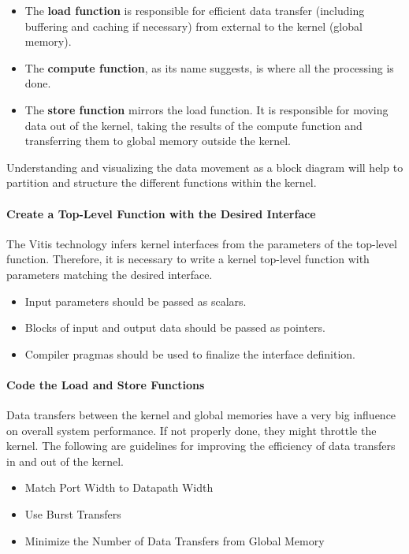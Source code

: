 \begin{itemize}
    \item The \textbf{load function} is responsible for efficient data transfer (including buffering and caching if necessary) from external to the kernel (\ie global memory).
    \item The \textbf{compute function}, as its name suggests, is where all the processing is done. 
    \item The \textbf{store function} mirrors the load function. It is responsible for moving data out of the kernel, taking the results of the compute function and transferring them to global memory outside the kernel.
\end{itemize}

Understanding and visualizing the data movement as a block diagram will help to partition and structure the different functions within the kernel.

\paragraph{Create a Top-Level Function with the Desired Interface}
The Vitis technology infers kernel interfaces from the parameters of the top-level function. Therefore, it is necessary to write a kernel top-level function with parameters matching the desired interface. 

\begin{itemize}
    \item Input parameters should be passed as scalars. 
    \item Blocks of input and output data should be passed as pointers. 
    \item Compiler pragmas should be used to finalize the interface definition. 
\end{itemize}

\paragraph{Code the Load and Store Functions}
Data transfers between the kernel and global memories have a very big influence on overall system performance. If not properly done, they might throttle the kernel. The following are guidelines for improving the efficiency of data transfers in and out of the kernel.

\begin{itemize}
    \item Match Port Width to Datapath Width
    \item Use Burst Transfers
    \item Minimize the Number of Data Transfers from Global Memory
\end{itemize}

